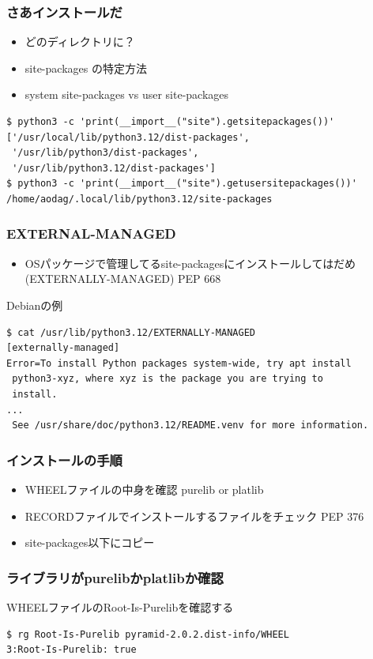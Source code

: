 \documentclass[aspectratio=169]{beamer}
\begin{document}
\begin{frame}[fragile]
\frametitle{さあインストールだ}
\begin{itemize}
\item どのディレクトリに？
\item site-packages の特定方法
\item system site-packages vs user site-packages
\end{itemize}

\begin{lstlisting}
$ python3 -c 'print(__import__("site").getsitepackages())'
['/usr/local/lib/python3.12/dist-packages',
 '/usr/lib/python3/dist-packages',
 '/usr/lib/python3.12/dist-packages']
$ python3 -c 'print(__import__("site").getusersitepackages())'
/home/aodag/.local/lib/python3.12/site-packages
\end{lstlisting}
\end{frame}

\begin{frame}[fragile]
\frametitle{EXTERNAL-MANAGED}
\begin{itemize}
\item OSパッケージで管理してるsite-packagesにインストールしてはだめ(EXTERNALLY-MANAGED) PEP 668
\end{itemize}
Debianの例
\begin{lstlisting}
$ cat /usr/lib/python3.12/EXTERNALLY-MANAGED
[externally-managed]
Error=To install Python packages system-wide, try apt install
 python3-xyz, where xyz is the package you are trying to
 install.
...
 See /usr/share/doc/python3.12/README.venv for more information.
\end{lstlisting}
\end{frame}

\begin{frame}
\frametitle{インストールの手順}
\begin{itemize}
\item WHEELファイルの中身を確認 purelib or platlib
\item RECORDファイルでインストールするファイルをチェック PEP 376
\item site-packages以下にコピー
\end{itemize}
\end{frame}

\begin{frame}[fragile]
\frametitle{ライブラリがpurelibかplatlibか確認}
WHEELファイルのRoot-Is-Purelibを確認する
\begin{lstlisting}
$ rg Root-Is-Purelib pyramid-2.0.2.dist-info/WHEEL
3:Root-Is-Purelib: true
\end{lstlisting}
\end{frame}
\end{document}
